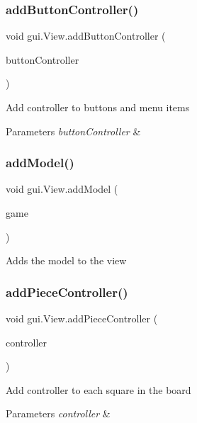 \subsubsection{\texorpdfstring{add\+Button\+Controller()}{addButtonController()}}
{\footnotesize\ttfamily void gui.\+View.\+add\+Button\+Controller (\begin{DoxyParamCaption}\item[{Action\+Listener}]{button\+Controller }\end{DoxyParamCaption})}

Add controller to buttons and menu items 
\begin{DoxyParams}{Parameters}
{\em button\+Controller} & \\
\hline
\end{DoxyParams}
\mbox{\label{classgui_1_1_view_af87d7ce351a4529a91bd4cd6215270f3}} 
\subsubsection{\texorpdfstring{add\+Model()}{addModel()}}
{\footnotesize\ttfamily void gui.\+View.\+add\+Model (\begin{DoxyParamCaption}\item[{\mbox{\hyperlink{classgui_1_1_game}{Game}}}]{game }\end{DoxyParamCaption})}

Adds the model to the view \mbox{\label{classgui_1_1_view_a66364784fcbb6df611784d77880e98bb}} 
\subsubsection{\texorpdfstring{add\+Piece\+Controller()}{addPieceController()}}
{\footnotesize\ttfamily void gui.\+View.\+add\+Piece\+Controller (\begin{DoxyParamCaption}\item[{Mouse\+Listener}]{controller }\end{DoxyParamCaption})}

Add controller to each square in the board 
\begin{DoxyParams}{Parameters}
{\em controller} & \\
\hline
\end{DoxyParams}
\mbox{\label{classgui_1_1_view_a97fe9c5584520573e63ad4af1988e970}} 
